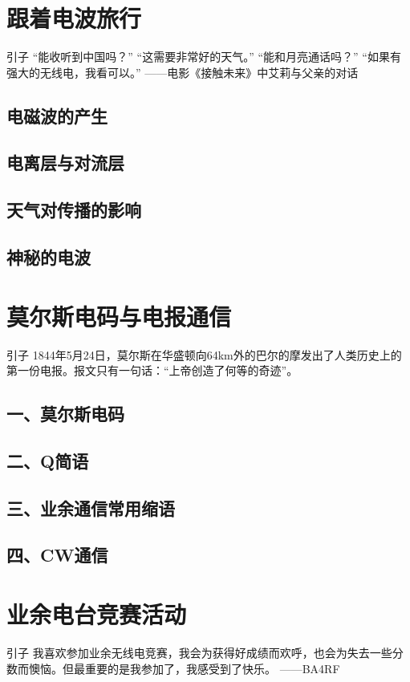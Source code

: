 \documentclass[12pt,UTF8]{ctexbook}
\begin{document}
\chapter{跟着电波旅行}

引子
“能收听到中国吗？”
“这需要非常好的天气。”
“能和月亮通话吗？”
“如果有强大的无线电，我看可以。”
——电影《接触未来》中艾莉与父亲的对话



\section{电磁波的产生}
\section{电离层与对流层}
\section{天气对传播的影响}
\section{神秘的电波}

\chapter{莫尔斯电码与电报通信}
引子
1844年5月24日，莫尔斯在华盛顿向64km外的巴尔的摩发出了人类历史上的第一份电报。报文只有一句话：“上帝创造了何等的奇迹”。
\section{一、莫尔斯电码}
\section{二、Q简语}
\section{三、业余通信常用缩语}
\section{四、CW通信}

\chapter{业余电台竞赛活动}
引子
我喜欢参加业余无线电竞赛，我会为获得好成绩而欢呼，也会为失去一些分数而懊恼。但最重要的是我参加了，我感受到了快乐。
——BA4RF
\end{document}
